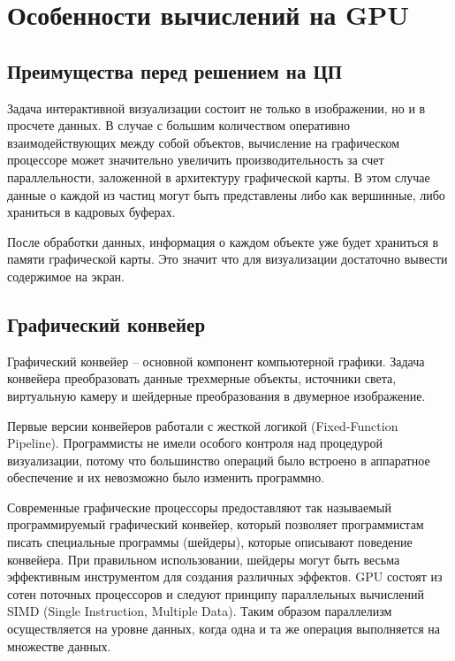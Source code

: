 \newpage
\section{Особенности вычислений на GPU}

\subsection{Преимущества перед решением на ЦП}

Задача интерактивной визуализации состоит не только в изображении, но и в просчете данных.
В случае с большим количеством оперативно взаимодействующих между собой объектов, вычисление
на графическом процессоре может значительно увеличить производительность за счет параллельности,
заложенной в архитектуру графической карты. В этом случае данные о каждой из частиц могут быть
представлены либо как вершинные, либо храниться в кадровых буферах.

После обработки данных, информация о каждом объекте уже будет храниться в памяти графической карты.
Это значит что для визуализации достаточно вывести содержимое на экран.

\subsection{Графический конвейер}

Графический конвейер -- основной компонент компьютерной графики. Задача конвейера преобразовать
данные трехмерные объекты, источники света, виртуальную камеру и шейдерные преобразования в 
двумерное изображение.

Первые версии конвейеров работали с жесткой логикой (Fixed-Function Pipeline).
Программисты не имели особого контроля над процедурой визуализации, потому что большинство
операций было встроено в аппаратное обеспечение и их невозможно было изменить программно.

Современные графические процессоры предоставляют так называемый программируемый графический
конвейер, который позволяет программистам писать специальные программы (шейдеры), которые
описывают поведение конвейера. При правильном использовании, шейдеры могут быть весьма эффективным
инструментом для создания различных эффектов. GPU состоят из сотен поточных процессоров и следуют
принципу параллельных вычислений SIMD (Single Instruction, Multiple Data). Таким образом
параллелизм осуществляется на уровне данных, когда одна и та же операция выполняется
на множестве данных.

